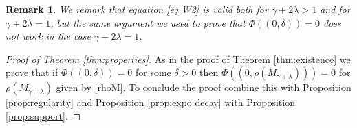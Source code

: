 \documentclass[11pt]{article}
\numberwithin{equation}{section}
\theoremstyle{plain}
\newtheorem{remark}[theorem]{Remark}
\begin{document}
 \begin{remark}
We remark that equation \eqref{eq W2} is valid both for $\gamma + 2 \lambda >1$ and for $\gamma+ 2 \lambda =1$, but the same argument we used to prove that $\Phi((0, \delta))=0$ does not work in the case $\gamma + 2 \lambda =1$.
 \end{remark}

\begin{proof}
[Proof of Theorem \ref{thm:properties}]
As in the proof of Theorem \ref{thm:existence} we prove that if $\Phi((0, \delta))=0$ for some $\delta>0$ then $\Phi((0, \rho(M_{\gamma+\lambda}) ))=0$ for $\rho(M_{\gamma+\lambda}) $ given by \eqref{rhoM}. 
To conclude the proof combine this with  Proposition \ref{prop:regularity} and Proposition \ref{prop:expo decay} with Proposition \ref{prop:support}. 
\end{proof}
\end{document}
